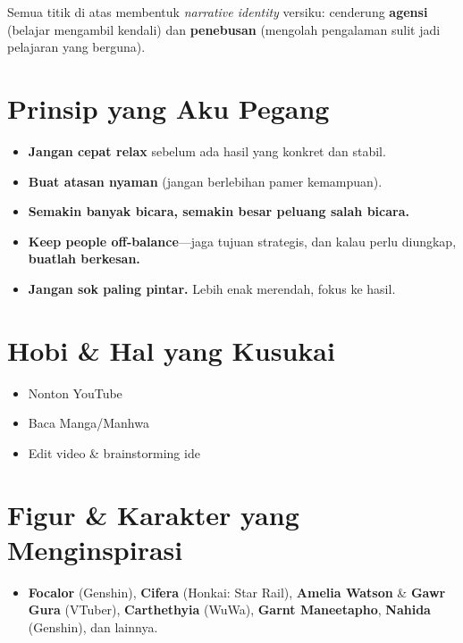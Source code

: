 \documentclass[
  letterpaper,
  DIV=11,
  numbers=noendperiod]{scrreprt}
\providecommand{\tightlist}{%
  \setlength{\itemsep}{0pt}\setlength{\parskip}{0pt}}
\begin{document}
Semua titik di atas membentuk \emph{narrative identity} versiku:
cenderung \textbf{agensi} (belajar mengambil kendali) dan
\textbf{penebusan} (mengolah pengalaman sulit jadi pelajaran yang
berguna).

\section{Prinsip yang Aku Pegang}\label{prinsip-yang-aku-pegang}

\begin{itemize}
\tightlist
\item
  \textbf{Jangan cepat relax} sebelum ada hasil yang konkret dan stabil.
\item
  \textbf{Buat atasan nyaman} (jangan berlebihan pamer kemampuan).
\item
  \textbf{Semakin banyak bicara, semakin besar peluang salah bicara.}
\item
  \textbf{Keep people off-balance}---jaga tujuan strategis, dan kalau
  perlu diungkap, \textbf{buatlah berkesan.}
\item
  \textbf{Jangan sok paling pintar.} Lebih enak merendah, fokus ke
  hasil.
\end{itemize}

\section{Hobi \& Hal yang Kusukai}\label{hobi-hal-yang-kusukai}

\begin{itemize}
\tightlist
\item
  Nonton YouTube
\item
  Baca Manga/Manhwa
\item
  Edit video \& brainstorming ide
\end{itemize}

\section{Figur \& Karakter yang
Menginspirasi}\label{figur-karakter-yang-menginspirasi}

\begin{itemize}
\tightlist
\item
  \textbf{Focalor} (Genshin), \textbf{Cifera} (Honkai: Star Rail),
  \textbf{Amelia Watson} \& \textbf{Gawr Gura} (VTuber),
  \textbf{Carthethyia} (WuWa), \textbf{Garnt Maneetapho},
  \textbf{Nahida} (Genshin), dan lainnya.
\end{itemize}
\end{document}
